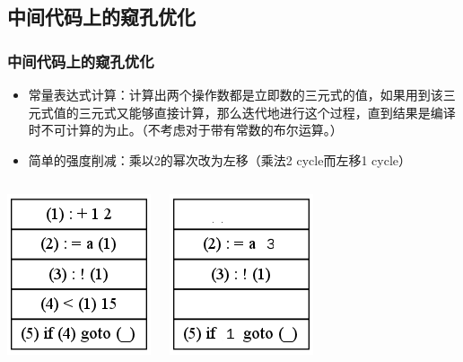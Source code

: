\documentclass{beamer}
\begin{document}
\subsection{中间代码上的窥孔优化}
\begin{frame}
	\frametitle{中间代码上的窥孔优化}
	\begin{itemize}
		\item 常量表达式计算：计算出两个操作数都是立即数的三元式的值，如果用到该三元式值的三元式又能够直接计算，那么迭代地进行这个过程，直到结果是编译时不可计算的为止。（不考虑对于带有常数的布尔运算。）
		\item 简单的强度削减：乘以2的幂次改为左移（乘法2 cycle而左移1 cycle）
	\end{itemize}
	\begin{columns}
		\begin{flushright}
			\includegraphics[scale=0.3]{before_const_expr.png}
		\end{flushright}
		\begin{flushleft}
			\includegraphics[scale=0.3]{after_const_expr.png}
		\end{flushleft}
	\end{columns}
\end{frame}
\end{document}
